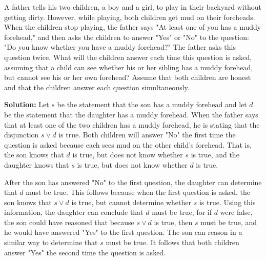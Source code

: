 \documentclass{Axon}
\begin{document}
\begin{example}
    A father tells his two children, a boy and a girl, to play in their backyard without getting dirty. However, while playing, both children get mud on their foreheads. When the children stop playing, the father says "At least one of you has a muddy forehead," and then asks the children to answer "Yes" or "No" to the question: "Do you know whether you have a muddy forehead?" The father asks this question twice. What will the children answer each time this question is asked, assuming that a child can see whether his or her sibling has a muddy forehead, but cannot see his or her own forehead? Assume that both children are honest and that the children answer each question simultaneously.

    \noindent
    \textbf{Solution:}
    Let \(s\) be the statement that the son has a muddy forehead and let \(d\) be the statement that the daughter has a muddy forehead. When the father says that at least one of the two children has a muddy forehead, he is stating that the disjunction \(s \lor d\) is true. Both children will answer "No" the first time the question is asked because each sees mud on the other child's forehead. That is, the son knows that \(d\) is true, but does not know whether \(s\) is true, and the daughter knows that \(s\) is true, but does not know whether \(d\) is true.

    After the son has answered "No" to the first question, the daughter can determine that \(d\) must be true. This follows because when the first question is asked, the son knows that \(s \lor d\) is true, but cannot determine whether \(s\) is true. Using this information, the daughter can conclude that \(d\) must be true, for if \(d\) were false, the son could have reasoned that because \(s \lor d\) is true, then \(s\) must be true, and he would have answered "Yes" to the first question. The son can reason in a similar way to determine that \(s\) must be true. It follows that both children answer "Yes" the second time the question is asked.
\end{example}

\printbibliography
\end{document}
